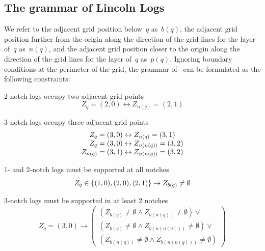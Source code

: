\subsection{The grammar of Lincoln Logs}
\label{sec:grammar}


We refer to the adjacent grid position below~$q$ as~$b(q)$, the adjacent grid
position further from the origin along the direction of the grid lines for the
layer of~$q$ as~$n(q)$, and the adjacent grid position closer to the origin
along the direction of the grid lines for the layer of~$q$ as~$p(q)$.
%
Ignoring boundary conditions at the perimeter of the grid, the grammar of
\LincolnLogs\ can be formulated as the following constraints:
%
\begin{compactenum}[a)]
%
\item 2-notch logs occupy two adjacent grid points
%
\label{constraintA}
%
\begin{displaymath}
Z_q=(2,0)\leftrightarrow Z_{n(q)}=(2,1)
\end{displaymath}
%
\item 3-notch logs occupy three adjacent grid points
%
\label{constraintB}
%
\begin{displaymath}
\begin{array}{r@{\;}c@{\;}l}
Z_q=(3,0)&\leftrightarrow&Z_{n(q)}=(3,1)\\
Z_q=(3,0)&\leftrightarrow&Z_{n(n(q))}=(3,2)\\
Z_{n(q)}=(3,1)&\leftrightarrow&Z_{n(n(q))}=(3,2)
\end{array}
\end{displaymath}
%
\item 1- and 2-notch logs must be supported at all notches
%
\label{constraintC}
%
\begin{displaymath}
Z_q\in\{(1,0),(2,0),(2,1)\}\rightarrow Z_{b(q)}\not=\emptyset
\end{displaymath}
%
\item 3-notch logs must be supported in at least 2 notches
%
\label{constraintD}
%
\begin{displaymath}
Z_q=(3,0)\rightarrow
\left(\begin{array}{l}
\left(Z_{b(q)}\not=\emptyset\wedge Z_{b(n(q))}\not=\emptyset\right)\vee\\
\left(Z_{b(q)}\not=\emptyset\wedge Z_{b(n(n(q)))}\not=\emptyset\right)\vee\\
\left(Z_{b(n(q))}\not=\emptyset\wedge Z_{b(n(n(q)))}\not=\emptyset\right)
\end{array}\right)

\end{displaymath}
\end{compactenum}
